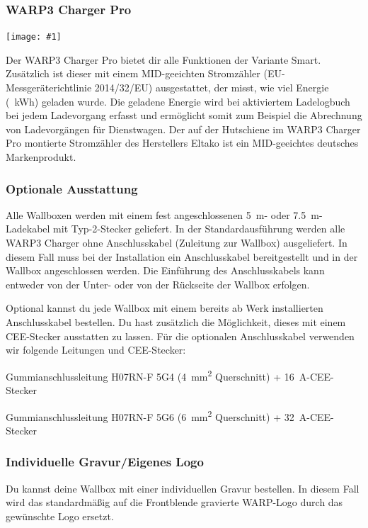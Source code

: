 \documentclass[a4paper,10pt]{article}
\newcommand{\gfx}[1]{\texttt{[image: \#1]}}
\begin{document}
\begin{multicols*}{2}
	\subsubsection*{WARP3 Charger Pro}
	\gfx{./img_warp3/resized/warp3_pro_open}

    Der WARP3 Charger Pro bietet dir alle Funktionen der Variante Smart.
    Zusätzlich ist dieser mit einem MID-geeichten Stromzähler (EU-Messgeräterichtlinie 2014/32/EU)
    ausgestattet, der misst, wie viel Energie (\SI{}{\kWh}) geladen
    wurde. Die geladene Energie wird bei aktiviertem Ladelogbuch bei jedem
	Ladevorgang erfasst und ermöglicht somit zum Beispiel die Abrechnung von Ladevorgängen für
	Dienstwagen. Der auf der Hutschiene im WARP3 Charger Pro montierte Stromzähler des Herstellers Eltako ist ein MID-geeichtes deutsches Markenprodukt.

	\subsubsection*{Optionale Ausstattung}
    Alle Wallboxen werden mit einem fest angeschlossenen
    \SI{5}{\meter}- oder \SI{7,5}{\meter}-Ladekabel mit Typ-2-Stecker geliefert.
    In der Standardausführung werden alle WARP3 Charger ohne Anschlusskabel
    (Zuleitung zur Wallbox) ausgeliefert. In diesem Fall muss bei der Installation
    ein Anschlusskabel bereitgestellt und in der Wallbox angeschlossen werden.
    Die Einführung des Anschlusskabels kann entweder von der Unter- oder von
    der Rückseite der Wallbox erfolgen.

    Optional kannst du jede Wallbox mit einem bereits ab Werk
    installierten Anschlusskabel bestellen. Du hast zusätzlich die
    Möglichkeit, dieses mit einem CEE-Stecker ausstatten zu lassen.
    Für die optionalen Anschluss\-kabel verwenden wir folgende Leitungen und CEE-Stecker:

    \begin{description}[leftmargin=!,labelwidth=\widthof{\textbf{\SI{22}{\kilo\watt}}}]
        \item[\SI{11}{\kilo\watt}]Gummianschlussleitung H07RN-F 5G4
              (\SI{4}{\square\milli\meter}
              Querschnitt) + \SI{16}{\ampere}-CEE-Stecker
        \item[\SI{22}{\kilo\watt}]Gummianschlussleitung H07RN-F 5G6
              (\SI{6}{\square\milli\meter}
              Querschnitt) + \SI{32}{\ampere}-CEE-Stecker
    \end{description}

	\subsubsection*{Individuelle Gravur/Eigenes Logo}
	Du kannst deine Wallbox mit einer individuellen Gravur bestellen.
	In diesem Fall wird das standardmäßig auf die Frontblende gravierte WARP-Logo
	durch das gewünschte Logo ersetzt.


\end{multicols*}
\end{document}
